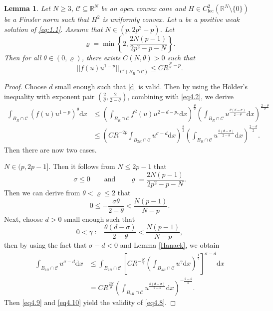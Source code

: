 \documentclass[12pt]{amsart}
\newtheorem{lem}[thm]{Lemma}
\theoremstyle{definition}
\theoremstyle{remark}
\theoremstyle{conclusion}
\theoremstyle{conjecture}
\numberwithin{equation}{section}
\begin{document}
\begin{lem}\label{lem4.4}
Let $N\geq3$, $\mathcal{C}\subseteq\mathbb{R}^{N}$ be an open convex cone and $H\in C^{2}_{\text{loc}}(\mathbb{R}^{N}\setminus\{0\})$ be a Finsler norm such that $H^{2}$ is uniformly convex. Let $u$ be a positive weak solution of \eqref{eq:1.1}. Assume that $N\in(p,2p^2-p)$. Let
$$\varrho=\min\left\{2,\frac{2N(p-1)}{2p^2-p-N}\right\} .$$
Then for all $\theta\in(0,\varrho)$, there exists $C(N,\theta)>0$ such that
\begin{equation}\label{eq4.8}
||f(u)u^{1-p}||_{L^{\theta}(B_R\cap\mathcal{C})}\leq CR^{\frac{N}{\theta}-p}.
\end{equation}
\end{lem}
\begin{proof}
Choose $d$ small enough such that \eqref{d} is valid. Then by using the H\"{o}lder's inequality with exponent pair $(\frac{2}{\theta},\frac{2}{2-\theta})$, combining with \eqref{eq4.2}, we derive
\begin{equation}\label{eq4.9}
  \begin{aligned}
    \int_{B_R\cap\mathcal{C}}(f(u)u^{1-p})^{\theta}\mathrm{d}x
    &\leq \left(\int_{B_R\cap\mathcal{C}}f^2(u)u^{2-d-p_*}\mathrm{d}x\right)^{\frac{\theta}{2}} \left(\int_{B_R\cap\mathcal{C}}u^{\frac{\theta(d-\sigma)}{2-\theta}}\mathrm{d}x\right)^{\frac{2-\theta}{2}}\\
    &\leq \left(CR^{-2p}\int_{B_{2R}\cap\mathcal{C}}u^{\sigma-d}\mathrm{d}x\right)^{\frac{\theta}{2}} \left(\int_{B_R\cap\mathcal{C}}u^{\frac{\theta(d-\sigma)}{2-\theta}}\mathrm{d}x\right)^{\frac{2-\theta}{2}}.
  \end{aligned}
\end{equation}
Then there are now two cases.

\smallskip

 $N\in(p,2p-1]$. Then it follows from $N\leq2p-1$ that
$$\sigma\leq0\qquad\text{and}\qquad\varrho=\frac{2N(p-1)}{2p^2-p-N}.$$
Then we can derive from $\theta<\varrho\leq2$ that
$$0\leq-\frac{\sigma\theta}{2-\theta}<\frac{N(p-1)}{N-p}.$$
Next, choose $d>0$ small enough such that
$$0<\gamma:=\frac{\theta(d-\sigma)}{2-\theta}<\frac{N(p-1)}{N-p},$$
then by using the fact that $\sigma-d<0$ and Lemma \ref{Hanack}, we obtain
\begin{equation}\label{eq4.10}
  \begin{aligned}
  \int_{B_{2R}\cap\mathcal{C}}u^{\sigma-d}\mathrm{d}x
  &\leq\int_{B_{2R}\cap\mathcal{C}} \left[CR^{-\frac{N}{\gamma}}\left(\int_{B_{4R}\cap\mathcal{C}}u^{\gamma}\mathrm{d}x\right) ^{\frac{1}{\gamma}}\right] ^{\sigma-d}\mathrm{d}x\\
  &=CR^{\frac{2N}{\theta}}\left(\int_{B_{4R}\cap\mathcal{C}}u^{\frac{\theta(d-\sigma)}{2-\theta}}\mathrm{d}x\right) ^{-\frac{2-\theta}{\theta}}.
  \end{aligned}
\end{equation}
Then \eqref{eq4.9} and \eqref{eq4.10} yield the validity of \eqref{eq4.8}.


\end{proof}
\end{document}
